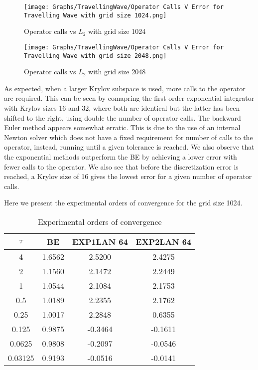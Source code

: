 \begin{figure}[H]
    \centering
    \begin{minipage}{0.49\textwidth}
        \texttt{[image: Graphs/TravellingWave/Operator Calls V Error for Travelling Wave with grid size 1024.png]} %
        \caption{Operator calls vs $L_2$ with grid size 1024}
        \label{fig:plot1}
    \end{minipage}\hfill
    \centering
    \begin{minipage}{0.49\textwidth}
        \texttt{[image: Graphs/TravellingWave/Operator Calls V Error for Travelling Wave with grid size 2048.png]} %
        \caption{Operator calls vs $L_2$ with grid size 2048}
        \label{fig:plot2}
    \end{minipage}\hfill
\end{figure}

As expected, when a larger Krylov subspace is used, more calls to the operator are required.
This can be seen by comapring the first order exponential integrator with Krylov sizes 16 and 32, where both are identical but the latter has been shifted to the right, using double the number of operator calls.
The backward Euler method appears somewhat erratic.
This is due to the use of an internal Newton solver which does not have a fixed requirement for number of calls to the operator, instead, running until a given tolerance is reached.
We also observe that the exponential methods outperform the BE by achieving a lower error with fewer calls to the operator.
We also see that before the discretization error is reached, a Krylov size of 16 gives the lowest error for a given number of operator calls.

Here we present the experimental orders of convergence for the grid size 1024.

\begin{table}[H]
    \centering
    \begin{tabular}{| c | c | c | c |}
    \hline
    $\tau$ & BE & EXP1LAN 64 & EXP2LAN 64 \\
    \hline
    4 & 1.6562 & 2.5200 & 2.4275 \\
    2 & 1.1560 & 2.1472 & 2.2449 \\
    1 & 1.0544 & 2.1084 & 2.1753 \\
    0.5 & 1.0189 & 2.2355 & 2.1762 \\
    0.25 & 1.0017 & 2.2848 & 0.6355 \\
    0.125 & 0.9875 & -0.3464 & -0.1611 \\
    0.0625 & 0.9808 & -0.2097 & -0.0546 \\
    0.03125 & 0.9193 & -0.0516 & -0.0141 \\
    \hline
    \end{tabular}
    \caption{Experimental orders of convergence}
    \label{tab:EOCs}
\end{table}



